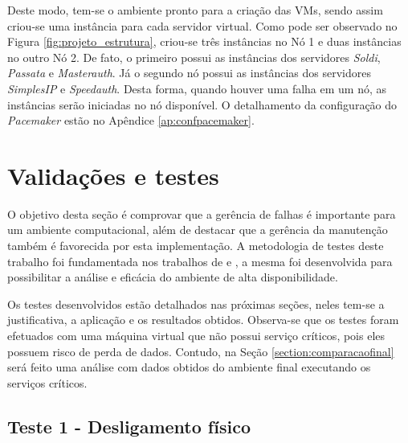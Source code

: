 
Deste modo, tem-se o ambiente pronto para a criação das \acp{VM}, sendo assim criou-se uma instância para cada servidor virtual. 
Como pode ser observado no Figura \ref{fig:projeto_estrutura}, criou-se três instâncias no Nó 1 e duas instâncias no outro Nó 2. De fato, o 
primeiro possui as instâncias dos servidores \textit{Soldi}, \textit{Passata} e \textit{Masterauth}. Já o segundo nó possui as instâncias dos 
servidores \textit{SimplesIP} e \textit{Speedauth}. Desta forma, quando houver uma falha em um nó, as instâncias serão iniciadas no nó disponível.
O detalhamento da configuração do \textit{Pacemaker} estão no Apêndice \ref{ap:confpacemaker}.


\section{Validações e testes}
\label{section:testes}

O objetivo desta seção é comprovar que a gerência de falhas é importante para um ambiente computacional, além de destacar que a gerência da 
manutenção também é favorecida por esta implementação.
A metodologia de testes deste trabalho foi fundamentada nos trabalhos de \cite{reis2009} e \cite{goncalves2009}, a mesma foi desenvolvida para 
possibilitar a análise e eficácia do ambiente de alta disponibilidade. 

Os testes desenvolvidos estão detalhados nas próximas seções, neles tem-se a justificativa, a aplicação e os resultados obtidos.
Observa-se que os testes foram efetuados com uma máquina virtual que não possui serviço críticos, pois eles possuem risco de perda de dados.
Contudo, na Seção \ref{section:comparacaofinal} será feito uma análise com dados obtidos do ambiente final executando os serviços críticos.

\subsection{Teste 1 - Desligamento físico}

